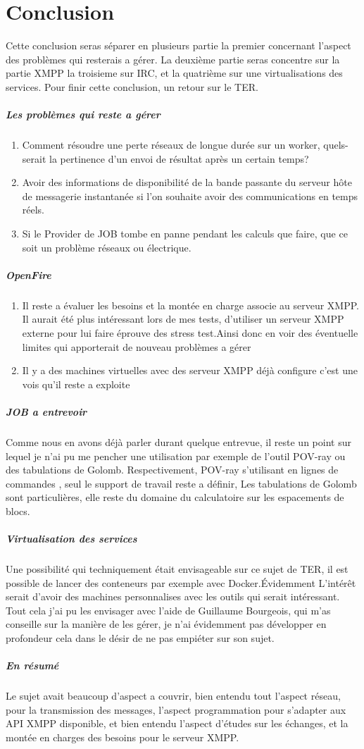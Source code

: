 \documentclass[11pt]{article}
\begin{document}
\newpage
\section{Conclusion}
Cette conclusion seras séparer en plusieurs partie la premier concernant l'aspect des problèmes qui resterais a gérer. La deuxième partie seras concentre sur la partie XMPP la troisieme sur IRC, et la quatrième sur une virtualisations des services. Pour finir cette conclusion, un retour sur le TER.
\subparagraph{Les problèmes qui reste a gérer}
\begin{enumerate}
	\item Comment résoudre une perte réseaux  de longue durée sur un worker, quels-serait la pertinence d'un envoi de résultat après un certain temps? 
	\item Avoir des informations de disponibilité de la bande passante du serveur hôte de messagerie instantanée si l'on souhaite avoir des communications en temps réels.
	\item Si le Provider de JOB tombe en panne pendant les calculs que faire, que ce soit un problème réseaux ou électrique. 
\end{enumerate}
\subparagraph{OpenFire}
\begin{enumerate}
\item Il reste a évaluer les besoins et la montée en charge associe au serveur XMPP. Il aurait été plus intéressant lors de mes tests, d'utiliser un serveur XMPP externe pour lui faire éprouve des stress test.Ainsi donc en voir des éventuelle limites qui apporterait de nouveau problèmes a gérer 
\item Il y a des machines virtuelles avec des serveur XMPP déjà configure c'est une vois qu'il reste a exploite 
\end{enumerate}

\subparagraph{JOB a entrevoir} 
Comme nous en avons déjà parler durant quelque entrevue, il reste un point sur lequel je n'ai pu me pencher une utilisation par exemple de l'outil POV-ray ou des tabulations de Golomb. Respectivement, POV-ray s'utilisant en lignes de commandes , seul le support de travail reste a définir, Les tabulations de Golomb sont particulières, elle reste du domaine du calculatoire sur les espacements de blocs. 
\subparagraph{Virtualisation des services}
Une possibilité qui techniquement était envisageable sur ce sujet de TER,  il est possible de lancer des conteneurs par exemple avec Docker.Évidemment L’intérêt serait d'avoir des machines personnalises avec les outils qui serait intéressant. Tout cela j'ai pu les envisager avec l'aide de Guillaume Bourgeois, qui m'as conseille sur la manière de les gérer, je n'ai évidemment pas développer en profondeur cela dans le désir de ne pas empiéter sur son sujet.
\subparagraph{En résumé } 
Le sujet avait beaucoup d'aspect a couvrir, bien entendu tout l'aspect réseau, pour la transmission des messages, l'aspect programmation pour s'adapter aux API XMPP disponible, et bien entendu l'aspect d’études sur les échanges, et la montée en charges  des besoins pour le serveur XMPP.
\end{document}
